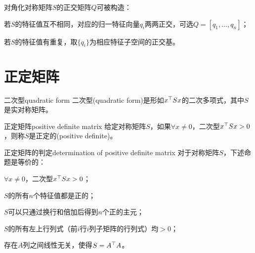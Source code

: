 
\begin{remark}
	对角化对称矩阵$S$的正交矩阵$Q$可被构造：
	\begin{compactitem}
		\item 若$S$的特征值互不相同，对应的归一特征向量$q_i$两两正交，可选$Q=[q_1,\ldots,q_n]$；
		\item 若$S$的特征值有重复，取$\{q_i\}$为相应特征子空间的正交基。
	\end{compactitem}
\end{remark}

\section{正定矩阵}

\begin{definition}{二次型}{quadratic form}
	二次型(quadratic form)是形如$x^\top Sx$的二次多项式，其中$S$是实对称矩阵。
\end{definition}
\begin{definition}{正定矩阵}{positive definite matrix}
	给定对称矩阵$S$，如果$\forall x\neq 0$，二次型$x^\top Sx>0$，则称$S$是正定的(positive definite)。
\end{definition}
\begin{theorem}{正定矩阵的判定}{determination of positive definite matrix}
	对于对称矩阵$S$，下述命题是等价的：
	\begin{compactenum}
		\item $\forall x\neq 0$，二次型$x^\top Sx>0$；
		\item $S$的所有$n$个特征值都是正的；
		\item $S$可以只通过换行和倍加后得到$n$个正的主元；
		\item $S$的所有左上行列式（前$i$行$i$列子矩阵的行列式）均$>0$；
		\item 存在$A$列之间线性无关，使得$S=A^\top A$。
	\end{compactenum}
\end{theorem}
